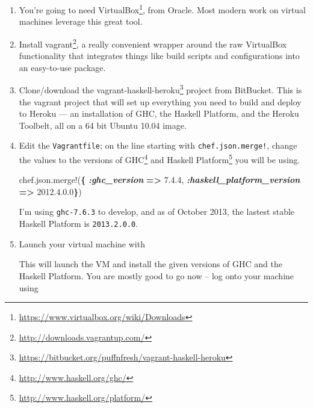 \documentclass[]{article}
\newenvironment{Shaded}{}{}
\newcommand{\AttributeTok}[1]{\textcolor[rgb]{0.49,0.56,0.16}{#1}}
\newcommand{\ExtensionTok}[1]{#1}
\newcommand{\KeywordTok}[1]{\textcolor[rgb]{0.00,0.44,0.13}{\textbf{#1}}}
\newcommand{\NormalTok}[1]{#1}
\newcommand{\VerbatimStringTok}[1]{\textcolor[rgb]{0.25,0.44,0.63}{#1}}
\newcommand{\WarningTok}[1]{\textcolor[rgb]{0.38,0.63,0.69}{\textbf{\textit{#1}}}}
\renewcommand{\href}[2]{#2\footnote{\url{#1}}}
\begin{document}
\begin{enumerate}
\def\labelenumi{\arabic{enumi}.}
\item
  You're going to need
  \href{https://www.virtualbox.org/wiki/Downloads}{VirtualBox}, from Oracle.
  Most modern work on virtual machines leverage this great tool.
\item
  Install \href{http://downloads.vagrantup.com/}{vagrant}, a really convenient
  wrapper around the raw VirtualBox functionality that integrates things like
  build scripts and configurations into an easy-to-use package.
\item
  Clone/download the
  \href{https://bitbucket.org/puffnfresh/vagrant-haskell-heroku}{vagrant-haskell-heroku}
  project from BitBucket. This is the vagrant project that will set up
  everything you need to build and deploy to Heroku --- an installation of GHC,
  the Haskell Platform, and the Heroku Toolbelt, all on a 64 bit Ubuntu 10.04
  image.
\item
  Edit the \texttt{Vagrantfile}; on the line starting with
  \texttt{chef.json.merge!}, change the values to the versions of
  \href{http://www.haskell.org/ghc/}{GHC} and
  \href{http://www.haskell.org/platform/}{Haskell Platform} you will be using.

\begin{Shaded}
\begin{Highlighting}[]
\NormalTok{chef}\AttributeTok{.json.merge!}\NormalTok{(}\KeywordTok{\{} \WarningTok{:ghc\_version} \KeywordTok{=\textgreater{}} \VerbatimStringTok{\textquotesingle{}7.4.4\textquotesingle{}}\NormalTok{,}
                   \WarningTok{:haskell\_platform\_version} \KeywordTok{=\textgreater{}} \VerbatimStringTok{\textquotesingle{}2012.4.0.0\textquotesingle{}}\KeywordTok{\}}\NormalTok{)}
\end{Highlighting}
\end{Shaded}

  I'm using \texttt{ghc-7.6.3} to develop, and as of October 2013, the lastest
  stable Haskell Platform is \texttt{2013.2.0.0}.
\item
  Launch your virtual machine with

\begin{Shaded}
\end{Shaded}

  This will launch the VM and install the given versions of GHC and the Haskell
  Platform. You are mostly good to go now -- log onto your machine using


\end{enumerate}
\end{document}
